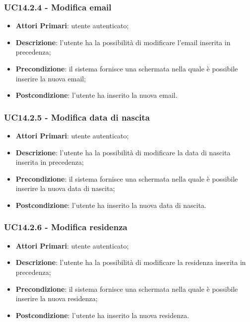 \subsubsection{UC14.2.4 - Modifica email}
\begin{itemize}
	\item \textbf{Attori Primari}: utente autenticato;
	\item \textbf{Descrizione}: l'utente ha la possibilità di modificare l'email inserita in precedenza;
	\item \textbf{Precondizione}: il sistema fornisce una schermata nella quale è possibile inserire la nuova email;
	\item \textbf{Postcondizione}: l'utente ha inserito la nuova email.
\end{itemize}

\subsubsection{UC14.2.5 - Modifica data di nascita}
\begin{itemize}
	\item \textbf{Attori Primari}: utente autenticato;
	\item \textbf{Descrizione}: l'utente ha la possibilità di modificare la data di nascita inserita in precedenza;
	\item \textbf{Precondizione}: il sistema fornisce una schermata nella quale è possibile inserire la nuova data di nascita;
	\item \textbf{Postcondizione}: l'utente ha inserito la nuova data di nascita.
\end{itemize}

\subsubsection{UC14.2.6 - Modifica residenza}
\begin{itemize}
	\item \textbf{Attori Primari}: utente autenticato;
	\item \textbf{Descrizione}: l'utente ha la possibilità di modificare la residenza inserita in precedenza;
	\item \textbf{Precondizione}: il sistema fornisce una schermata nella quale è possibile inserire la nuova residenza;
	\item \textbf{Postcondizione}: l'utente ha inserito la nuova residenza.
\end{itemize}

